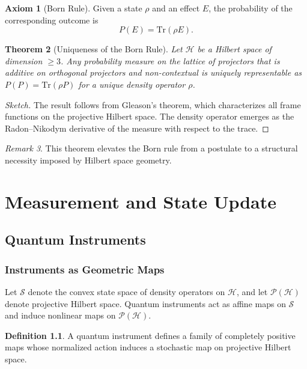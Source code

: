 \documentclass[12pt]{book}
\theoremstyle{plain}
\newtheorem{theorem}{Theorem}[chapter]
\theoremstyle{definition}
\newtheorem{definition}[theorem]{Definition}
\newtheorem{axiom}[theorem]{Axiom}
\theoremstyle{remark}
\newtheorem{remark}[theorem]{Remark}
\begin{document}
\begin{axiom}[Born Rule]
Given a state $\rho$ and an effect $E$, the probability of the corresponding outcome is
\[
P(E) = \mathrm{Tr}(\rho E).
\]
\end{axiom}

\begin{theorem}[Uniqueness of the Born Rule]
Let $\mathcal{H}$ be a Hilbert space of dimension $\geq 3$. Any probability measure on the lattice of projectors that is additive on orthogonal projectors and non-contextual is uniquely representable as $P(P)=\mathrm{Tr}(\rho P)$ for a unique density operator $\rho$.
\end{theorem}

\begin{proof}[Sketch]
The result follows from Gleason's theorem, which characterizes all frame functions on the projective Hilbert space. The density operator emerges as the Radon--Nikodym derivative of the measure with respect to the trace.
\end{proof}

\begin{remark}
This theorem elevates the Born rule from a postulate to a structural necessity imposed by Hilbert space geometry.
\end{remark}

\part{Measurement and State Update}

\chapter{Quantum Instruments}

\section{Instruments as Geometric Maps}

Let $\mathcal{S}$ denote the convex state space of density operators on $\mathcal{H}$, and let $\mathcal{P}(\mathcal{H})$ denote projective Hilbert space. Quantum instruments act as affine maps on $\mathcal{S}$ and induce nonlinear maps on $\mathcal{P}(\mathcal{H})$.

\begin{definition}
A quantum instrument defines a family of completely positive maps whose normalized action induces a stochastic map on projective Hilbert space.
\end{definition}
\end{document}
